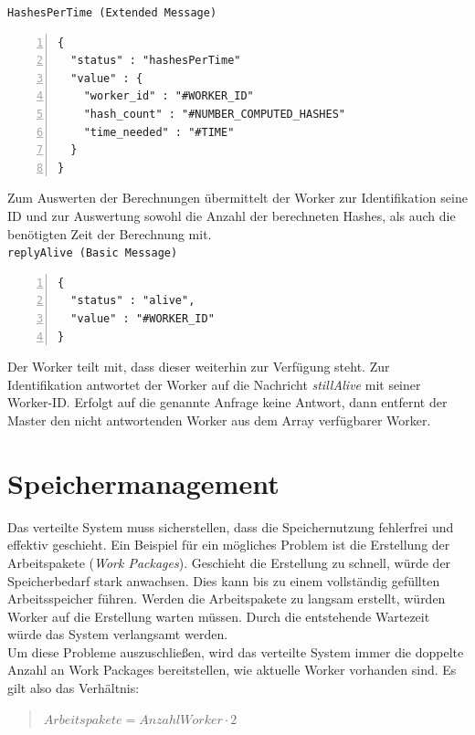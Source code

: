 \texttt{HashesPerTime (Extended Message)}
\begin{lstlisting}[basicstyle=\ttfamily,numbers=left,numberstyle=\footnotesize\ttfamily,backgroundcolor=\color{sourcegray}]
{
  "status" : "hashesPerTime"
  "value" : {
    "worker_id" : "#WORKER_ID"
    "hash_count" : "#NUMBER_COMPUTED_HASHES"
    "time_needed" : "#TIME"
  }
}
\end{lstlisting}
Zum Auswerten der Berechnungen übermittelt der Worker zur Identifikation seine ID und zur Auswertung sowohl die Anzahl der berechneten Hashes, als auch die benötigten Zeit der Berechnung mit. \\

\texttt{replyAlive (Basic Message)}
\begin{lstlisting}[basicstyle=\ttfamily,numbers=left,numberstyle=\footnotesize\ttfamily,backgroundcolor=\color{sourcegray}]
{
  "status" : "alive",
  "value" : "#WORKER_ID"
}
\end{lstlisting}
Der Worker teilt mit, dass dieser weiterhin zur Verfügung steht. Zur Identifikation antwortet der Worker auf die Nachricht 
\emph{stillAlive} mit seiner Worker-ID. Erfolgt auf die genannte Anfrage keine Antwort, dann entfernt der Master den nicht antwortenden Worker aus dem Array verfügbarer Worker.\\



\section{Speichermanagement}
Das verteilte System muss sicherstellen, dass die Speichernutzung fehlerfrei und effektiv geschieht. Ein Beispiel für ein mögliches Problem ist die Erstellung der Arbeitspakete (\emph{Work Packages}). Geschieht die Erstellung zu schnell, würde der Speicherbedarf stark anwachsen. Dies kann bis zu einem vollständig gefüllten Arbeitsspeicher führen. Werden die Arbeitspakete zu langsam erstellt, würden Worker auf die Erstellung warten müssen. Durch die entstehende Wartezeit würde das System verlangsamt werden. \\
Um diese Probleme auszuschließen, wird das verteilte System immer die doppelte Anzahl an Work Packages bereitstellen, wie aktuelle Worker vorhanden sind. Es gilt also das Verhältnis:

\begin{quotation}
\begin{math}
Arbeitspakete = Anzahl Worker \cdot 2 \end{math}
\end{quotation}


